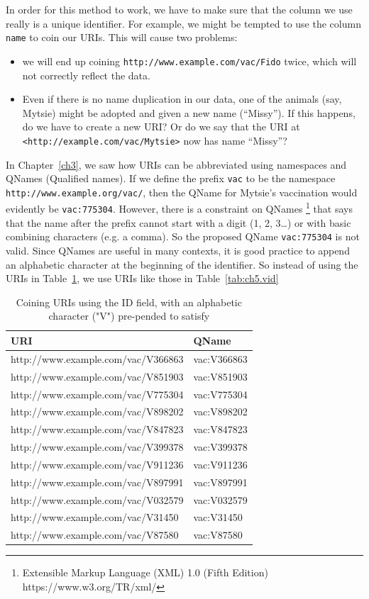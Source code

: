 In order for this method to work, we have to make sure that the column we use really is a unique  identifier. 
For example, we might be tempted to use the column \texttt{name} to coin our URIs.  
This will cause two problems: 

\begin{itemize}
    \item we will end up coining 
\texttt{http://www.example.com/vac/Fido} twice, which will not correctly reflect the data. 
\item Even if there is no  name duplication in our data, one of the animals (say, Mytsie) might be adopted and given a new name (``Missy'').  If this happens, do we have to create a new URI?   Or do we say that the URI at \texttt{<http://example.com/vac/Mytsie>} now has name ``Missy''?
\end{itemize}

In Chapter~\ref{ch3}, we saw how URIs can be abbreviated using namespaces and QNames (Qualified names). 
If we define the prefix \texttt{vac} to be the namespace
\texttt{http://www.example.org/vac/}, then the QName for Mytsie's vaccination would evidently   be
\texttt{vac:775304}.   However, there is a constraint on QNames \footnote{Extensible Markup Language
 (XML) 1.0 (Fifth Edition) https://www.w3.org/TR/xml/} that says that the name after the 
 prefix cannot start with a digit (1, 2,
3\ldots{}) or with basic combining characters (e.g. a comma).  So the proposed QName \texttt{vac:775304} is not valid.  Since QNames are useful in many contexts, it is good practice to append an alphabetic character at the beginning of the identifier.  So instead of using the URIs in Table~\ref{tab:ch5.id}, we use URIs like those in Table~\ref{tab:ch5.vid}

\begin{table}
    \centering
    \begin{tabular}{|l l|}
    \hline
    URI&QName \\
    \hline\hline
http://www.example.com/vac/V366863&vac:V366863 \\
http://www.example.com/vac/V851903&vac:V851903 \\
http://www.example.com/vac/V775304&vac:V775304 \\
http://www.example.com/vac/V898202&vac:V898202 \\
http://www.example.com/vac/V847823&vac:V847823 \\
http://www.example.com/vac/V399378&vac:V399378 \\
http://www.example.com/vac/V911236&vac:V911236 \\
http://www.example.com/vac/V897991&vac:V897991 \\
http://www.example.com/vac/V032579&vac:V032579 \\
http://www.example.com/vac/V31450&vac:V31450 \\
http://www.example.com/vac/V87580&vac:V87580 \\
\hline
    \end{tabular}
    \caption{Coining URIs using the ID field, with an alphabetic character ("V") pre-pended to satisfy  }
    \label{tab:ch5.id}
\end{table}

